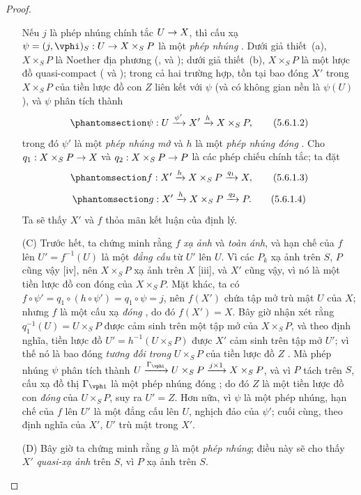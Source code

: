 \documentclass[oneside,10pt]{amsart}
\makeatletter
\newcommand{\ega@arrow}[2]{\mathchoice{#1}{#2}{#2}{#2}}
\renewcommand{\to}{\ega@arrow{\longrightarrow}{\rightarrow}}
\newcommand{\oldpage}[2][]{\marginnote{\normalfont\footnotesize\textbf{#1}~|~#2}\ignorespaces}
\let\EGAOriginalLabel\label
\renewcommand{\label}[1]{\phantomsection\EGAOriginalLabel{#1}}
\makeatother
\begin{document}
\begin{proof}
\begin{enumerate}
    Nếu $j$ là phép nhúng chính tắc $U\to X$, thì cấu xạ $\psi=(j,\vphi)_S:U\to X\times_S P$ là một \emph{phép nhúng} .
    Dưới giả thiết~(a), $X\times_S P$ là Noether địa phương (,  và );
    dưới giả thiết~(b), $X\times_S P$ là một lược đồ quasi-compact ( và );
    trong cả hai trường hợp, tồn tại bao đóng $X'$ trong $X\times_S P$ của tiền lược đồ con $Z$ liên kết với $\psi$ (và có không gian nền là $\psi(U)$), và $\psi$ phân tích thành
    \[
    \label{II.5.6.1.2}
      \psi:U\xrightarrow{\psi'}X'\xrightarrow{h}X\times_S P,
      \tag{5.6.1.2}
    \]
    trong đó $\psi'$ là một \emph{phép nhúng mở} và $h$ là một \emph{phép nhúng đóng} .
    Cho $q_1:X\times_S P\to X$ và $q_2:X\times_S P\to P$ là các phép chiếu chính tắc; ta đặt
    \[
    \label{II.5.6.1.3}
      f:X'\xrightarrow{h}X\times_S P\xrightarrow{q_1}X,
      \tag{5.6.1.3}
    \]
    \[
    \label{II.5.6.1.4}
      g:X'\xrightarrow{h}X\times_S P\xrightarrow{q_2}P.
      \tag{5.6.1.4}
    \]
    Ta sẽ thấy $X'$ và $f$ thỏa mãn kết luận của định lý.
  \item[(C)] Trước hết, ta chứng minh rằng $f$ \emph{xạ ảnh} và \emph{toàn ánh}, và hạn chế của $f$ lên $U'=f^{-1}(U)$ là một \emph{đẳng cấu} từ $U'$ lên $U$.
    Vì các $P_k$ xạ ảnh trên $S$, $P$ cũng vậy [iv], nên $X\times_S P$ xạ ảnh trên $X$ [iii], và $X'$ cũng vậy, vì nó là một tiền lược đồ con đóng của $X\times_S P$.
    Mặt khác, ta có $f\circ\psi'=q_1\circ(h\circ\psi')=q_1\circ\psi=j$, nên $f(X')$ chứa tập mở trù mật $U$ của $X$; nhưng $f$ là một cấu xạ \emph{đóng} , do đó $f(X')=X$.
    Bây giờ nhận xét rằng $q_1^{-1}(U)=U\times_S P$ được cảm sinh trên một tập mở của $X\times_S P$, và theo định nghĩa, tiền lược đồ $U'=h^{-1}(U\times_S P)$ được $X'$ cảm sinh trên tập mở $U'$; vì thế nó là bao đóng \emph{tương đối trong}
\oldpage[II]{108}
$U\times_S P$ của tiền lược đồ $Z$ .
Mà phép nhúng $\psi$ phân tích thành $U\xrightarrow{\Gamma_\vphi}U\times_S P\xrightarrow{j\times1}X\times_S P$, và vì $P$ tách trên $S$, cấu xạ đồ thị $\Gamma_\vphi$ là một phép nhúng đóng ; do đó $Z$ là một tiền lược đồ con \emph{đóng} của $U\times_S P$, suy ra $U'=Z$.
Hơn nữa, vì $\psi$ là một phép nhúng, hạn chế của $f$ lên $U'$ là một đẳng cấu lên $U$, nghịch đảo của $\psi'$; cuối cùng, theo định nghĩa của $X'$, $U'$ trù mật trong $X'$.
  \item[(D)] Bây giờ ta chứng minh rằng $g$ là một \emph{phép nhúng}; điều này sẽ cho thấy $X'$ \emph{quasi-xạ ảnh} trên $S$, vì $P$ xạ ảnh trên $S$.

\end{enumerate}
\end{proof}
\end{document}
